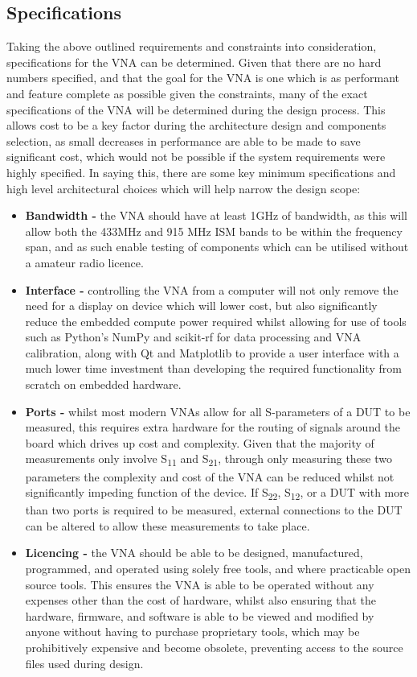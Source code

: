 \subsection{Specifications}
\label{subsec:specifications}
Taking the above outlined requirements and constraints into consideration, specifications for the VNA can be determined. Given that there are no hard numbers specified, and that the goal for the VNA is one which is as performant and feature complete as possible given the constraints, many of the exact specifications of the VNA will be determined during the design process. This allows cost to be a key factor during the architecture design and components selection, as small decreases in performance are able to be made to save significant cost, which would not be possible if the system requirements were highly specified. In saying this, there are some key minimum specifications and high level architectural choices which will help narrow the design scope:
\begin{itemize}
	\item \textbf{Bandwidth -} the VNA should have at least 1GHz of bandwidth, as this will allow both the 433MHz and 915 MHz ISM bands to be within the frequency span, and as such enable testing of components which can be utilised without a amateur radio licence. 
	\item \textbf{Interface -} controlling the VNA from a computer will not only remove the need for a display on device which will lower cost, but also significantly reduce the embedded compute power required whilst allowing for use of tools such as Python's NumPy and scikit-rf for data processing and VNA calibration, along with Qt and Matplotlib to provide a user interface with a much lower time investment than developing the required functionality from scratch on embedded hardware. 
	\item \textbf{Ports -} whilst most modern VNAs allow for all S-parameters of a DUT to be measured, this requires extra hardware for the routing of signals around the board which drives up cost and complexity. Given that the majority of measurements only involve S\textsubscript{11} and S\textsubscript{21}, through only measuring these two parameters the complexity and cost of the VNA can be reduced whilst not significantly impeding function of the device. If S\textsubscript{22}, S\textsubscript{12}, or a DUT with more than two ports is required to be measured, external connections to the DUT can be altered to allow these measurements to take place.  
	\item \textbf{Licencing -} the VNA should be able to be designed, manufactured, programmed, and operated using solely free tools, and where practicable open source tools. This ensures the VNA is able to be operated without any expenses other than the cost of hardware, whilst also ensuring that the hardware, firmware, and software is able to be viewed and modified by anyone without having to purchase proprietary tools, which may be prohibitively expensive and become obsolete, preventing access to the source files used during design. 
\end{itemize}